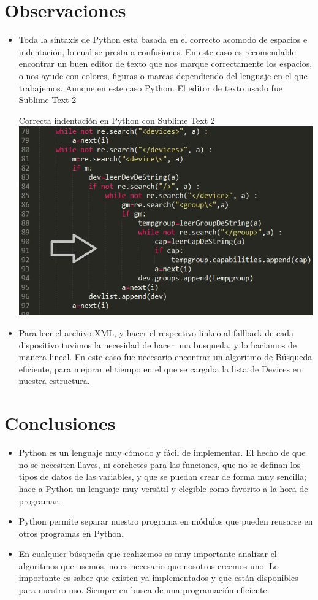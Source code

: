 \documentclass[11pt]{article} %
\begin{document}
\section{Observaciones}
\begin{itemize}
\item  Toda la sintaxis de Python esta basada en el correcto acomodo de espacios e indentación, lo cual se presta a confusiones. En este caso es recomendable encontrar un buen editor de texto que nos marque correctamente los espacios, o nos ayude con colores, figuras o marcas dependiendo del lenguaje en el que trabajemos. Aunque en este caso Python. El editor de texto usado fue Sublime Text 2
\begin{center}
Correcta indentación en Python con Sublime Text 2\\
\includegraphics[scale=0.80]{Imagenes/6.jpg}
\end{center}
\item  Para leer el archivo XML, y hacer el respectivo linkeo al fallback de cada dispositivo tuvimos la necesidad de hacer una busqueda, y lo haciamos de manera lineal. En este caso fue necesario encontrar un algoritmo de Búsqueda eficiente, para mejorar el tiempo en el que se cargaba la lista de Devices en nuestra estructura.
\end{itemize}

\section{ Conclusiones}
\begin{itemize}
\item Python es un lenguaje muy cómodo y fácil de implementar. El hecho de que no se necesiten llaves, ni corchetes para las funciones, que no se definan los tipos de datos de las variables, y que se puedan crear de forma muy sencilla; hace a Python un lenguaje muy versátil y elegible como favorito a la hora de programar.
\item Python permite separar nuestro programa en módulos que pueden reusarse en otros programas en Python.
\item En cualquier búsqueda que realizemos es muy importante analizar el algoritmos que usemos, no es necesario que nosotros creemos uno. Lo importante es saber que existen ya implementados y que están disponibles para nuestro uso. Siempre en busca de una programación eficiente.
\end {itemize}
\end{document}
